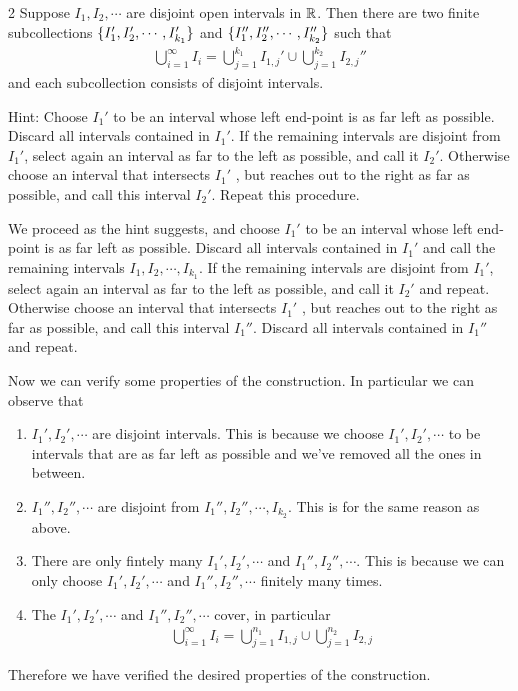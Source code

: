 \documentclass{scrartcl}
\begin{document}
\begin{problem}{2}
    Suppose $I_1, I_2, \cdots$ are disjoint open intervals in $\mathbb{R}$. Then there are two finite subcollections 
    $\{I_1', I_2', \cdots, I_{k_1}'\}$ and $\{I_1'', I_2'', \cdots, I_{k_2}''\}$ such that \begin{align*}
        \bigcup_{i=1}^\infty I_i = \bigcup_{j=1}^{k_1} I_{1,j}' \cup \bigcup_{j=1}^{k_2} I_{2,j}''
    \end{align*} and each subcollection consists of disjoint intervals.

    Hint: Choose $I_1'$ to be an interval whose left end-point is as far left as possible. Discard all intervals contained in $I_1'$.
     If the remaining intervals are disjoint from $I_1'$, select again an interval as far to the left as possible, and call it  $I_2'$.
     Otherwise choose an interval that intersects $I_1'$ , but reaches out to the right as far as possible, and call this interval $I_2'$.
     Repeat this procedure.
\end{problem}

\begin{solution}
We proceed as the hint suggests, and choose $I_1'$ to be an interval whose left end-point is as far left as possible.
Discard all intervals contained in $I_1'$ and call the remaining intervals $I_1, I_2, \cdots,I_{k_1}$.
If the remaining intervals are disjoint from $I_1'$, select again an interval as far to the left as possible, and call it  $I_2'$ and repeat.
Otherwise choose an interval that intersects $I_1'$ , but reaches out to the right as far as possible, and call this interval $I_1''$.
Discard all intervals contained in $I_1''$ and repeat.

Now we can verify some properties of the construction. In particular we can observe that
\begin{enumerate}
    \item $I_1', I_2', \cdots$ are disjoint intervals. This is because we choose $I_1', I_2', \cdots$ to be intervals that are as far left as possible and we've removed all the ones in between.
    \item $I_1'', I_2'', \cdots$ are disjoint from $I_1'', I_2'', \cdots,I_{k_2}$. This is for the same reason as above.
    \item There are only fintely many $I_1', I_2', \cdots$ and $I_1'', I_2'', \cdots$. This is because we can only choose $I_1', I_2', \cdots$ and $I_1'', I_2'', \cdots$ finitely many times.
    \item The $I_1', I_2', \cdots$ and $I_1'', I_2'', \cdots$ cover, in particular \begin{align*}
        \bigcup_{i=1}^\infty I_i = \bigcup_{j=1}^{n_1} I_{1,j} \cup \bigcup_{j=1}^{n_2} I_{2,j}
    \end{align*}
\end{enumerate}
Therefore we have verified the desired properties of the construction.
\end{solution}
\end{document}
